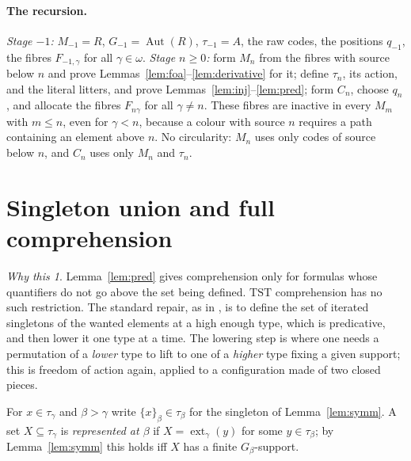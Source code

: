 \documentclass[11pt]{article}
\theoremstyle{definition}
\theoremstyle{remark}
\newtheorem*{idea}{Why this}
\newcommand{\TST}{\mathrm{TST}}
\newcommand{\Aut}{\operatorname{Aut}}
\newcommand{\ext}{\operatorname{ext}}
\begin{document}
\paragraph{The recursion.}
\emph{Stage \(-1\):} \(M_{-1}=R\), \(G_{-1}=\Aut(R)\), \(\tau_{-1}=A\), the
raw codes, the positions \(q_{-1}\), the fibres \(F_{-1,\gamma}\) for all
\(\gamma\in\omega\). \emph{Stage \(n\geq0\):} form \(M_n\) from the fibres
with source below \(n\) and prove Lemmas~\ref{lem:foa}--\ref{lem:derivative}
for it; define \(\tau_n\), its action, and the literal litters, and prove
Lemmas~\ref{lem:inj}--\ref{lem:pred}; form \(C_n\), choose \(q_n\), and
allocate the fibres \(F_{n\gamma}\) for all \(\gamma\neq n\). These fibres
are inactive in every \(M_m\) with \(m\leq n\), even for \(\gamma<n\),
because a colour with source \(n\) requires a path containing an element
above \(n\). No circularity: \(M_n\) uses only codes of source below
\(n\), and \(C_n\) uses only \(M_n\) and \(\tau_n\).

\section{Singleton union and full comprehension}\label{sec:union}

\begin{idea}
Lemma~\ref{lem:pred} gives comprehension only for formulas whose
quantifiers do not go above the set being defined. \(\TST\) comprehension
has no such restriction. The standard repair, as in \cite[\S4.6]{HW}, is
to define the set of iterated singletons of the wanted elements at a high
enough type, which is predicative, and then lower it one type at a time.
The lowering step is where one needs a permutation of a \emph{lower} type
to lift to one of a \emph{higher} type fixing a given support; this is
freedom of action again, applied to a configuration made of two closed
pieces.
\end{idea}

For \(x\in\tau_\gamma\) and \(\beta>\gamma\) write \(\{x\}_\beta\in
\tau_\beta\) for the singleton of Lemma~\ref{lem:symm}. A set
\(X\subseteq\tau_\gamma\) is \emph{represented at \(\beta\)} if \(X=
\ext_\gamma(y)\) for some \(y\in\tau_\beta\); by Lemma~\ref{lem:symm}
this holds iff \(X\) has a finite \(G_\beta\)-support.
\end{document}
